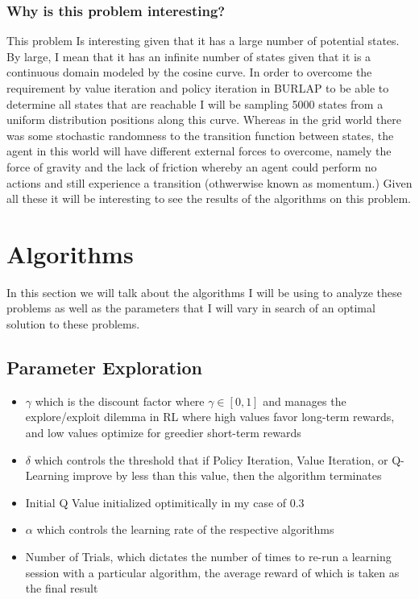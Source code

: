 \documentclass[11pt]{article}
\begin{document}
    \subsubsection{Why is this problem interesting?}
    This problem Is interesting given that it has a large number of potential states.
    By large, I mean that it has an infinite number of states given that it is a continuous domain modeled by the cosine curve.
    In order to overcome the requirement by value iteration and policy iteration in BURLAP to be able to determine all
    states that are reachable I will be sampling 5000 states from a uniform distribution positions along this curve.
    Whereas in the grid world there was some stochastic randomness to the transition function between states, the agent
    in this world will have different external forces to overcome, namely the force of gravity and the lack of friction
    whereby an agent could perform no actions and still experience a transition (othwerwise known as momentum.)
    Given all these it will be interesting to see the results of the algorithms on this problem.


    \section{Algorithms}
    In this section we will talk about the algorithms I will be using to analyze these problems as well as the parameters
    that I will vary in search of an optimal solution to these problems.
    \subsection{Parameter Exploration}
    \begin{itemize}
        \item $\gamma$ which is the discount factor where $\gamma \in [0,1]$ and manages the explore/exploit dilemma in RL where high values favor long-term rewards, and low values optimize for greedier short-term rewards
        \item $\delta$ which controls the threshold that if Policy Iteration, Value Iteration, or Q-Learning improve by less than this value, then the algorithm terminates
        \item Initial Q Value initialized optimitically in my case of 0.3
        \item $\alpha$ which controls the learning rate of the respective algorithms
        \item Number of Trials, which dictates the number of times to re-run a learning session with a particular algorithm, the average reward of which is taken as the final result
    \end{itemize}
\end{document}
